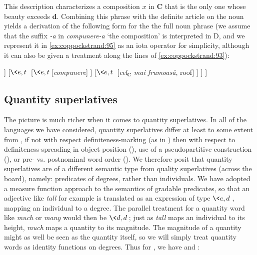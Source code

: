 \documentclass[output=paper
,modfonts
,nonflat]{langsci/langscibook}
\begin{document}
This description characterizes a composition $x$ in $\textbf{C}$ that is the only one whose beauty exceeds $\textbf{d}$. Combining this phrase with the definite article on the noun yields a derivation of the following form for the the full noun phrase (we assume that the suffix \textit{-a} in \textit{compunere-a} `the composition' is interpreted in D, and we represent it in \ref{ex:coppockstrand:95} as an iota operator for simplicity, although it can also be given a treatment along the lines of \ref{ex:coppockstrand:93}):

\ea{}\label{ex:coppockstrand:95}
\begin{forest}
	[{$e$}
		[{$\<\<\tau,t,\>,\tau\>$}[\textit{-a}]
		]
		[{$\<e,t\>$}
			[{$\<e,t\>$}[\textit{compunere}]
			]
			[{$\<e,t\>$} [\textit{cel}$_{\textbf{C}}$ \textit{mai frumoasă}, roof]
			]
		]
	]
\end{forest}
\z 

\subsection{Quantity superlatives}

The picture is much richer when it comes to quantity superlatives. In all of the languages we have considered, quantity superlatives differ at least to some extent from , if not with respect definiteness-marking (as in ) then with respect to definiteness-spreading in object position (), use of a pseudopartitive construction (), or pre- vs. postnominal word order (). We therefore posit that quantity superlatives are of a different semantic type from quality superlatives (across the board), namely: predicates of degrees, rather than individuals. We have adopted a measure function approach to the semantics of gradable predicates, so that an adjective like \textit{tall} for example is translated as an expression of type $\<e,d\>$, mapping an individual to a degree. The parallel treatment for a quantity word like \textit{much} or \textit{many} would then be $\<d,d\>$; just as \textit{tall} maps an individual to its height, \textit{much} maps a quantity to its magnitude. The magnitude of a quantity might as well be seen as the quantity itself, so we will simply treat quantity words as identity functions on degrees. Thus for , we have  and : 
\end{document}
